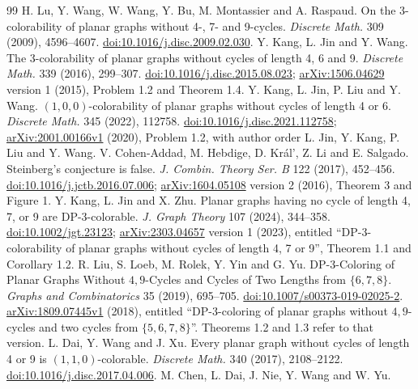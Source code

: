 \documentclass[11pt]{article}
\begin{document}
\begin{thebibliography}{99}
 H. Lu, Y. Wang, W. Wang, Y. Bu, M. Montassier and A. Raspaud.
On the 3-colorability of planar graphs without 4-, 7- and 9-cycles.
\emph{Discrete Math.} 309 (2009), 4596--4607.
\href{https://doi.org/10.1016/j.disc.2009.02.030}{doi:10.1016/j.disc.2009.02.030}.
 Y. Kang, L. Jin and Y. Wang.
The 3-colorability of planar graphs without cycles of length 4, 6 and 9.
\emph{Discrete Math.} 339 (2016), 299--307.
\href{https://doi.org/10.1016/j.disc.2015.08.023}{doi:10.1016/j.disc.2015.08.023};
\href{https://arxiv.org/abs/1506.04629v1}{arXiv:1506.04629} version 1 (2015), Problem 1.2 and Theorem 1.4.
 Y. Kang, L. Jin, P. Liu and Y. Wang.
$(1,0,0)$-colorability of planar graphs without cycles of length 4 or 6.
\emph{Discrete Math.} 345 (2022), 112758.
\href{https://doi.org/10.1016/j.disc.2021.112758}{doi:10.1016/j.disc.2021.112758};
\href{https://arxiv.org/abs/2001.00166v1}{arXiv:2001.00166v1} (2020), Problem 1.2, with author order L. Jin, Y. Kang, P. Liu and Y. Wang.
 V. Cohen-Addad, M. Hebdige, D. Král', Z. Li and E. Salgado.
Steinberg's conjecture is false.
\emph{J. Combin. Theory Ser. B} 122 (2017), 452--456.
\href{https://doi.org/10.1016/j.jctb.2016.07.006}{doi:10.1016/j.jctb.2016.07.006};
\href{https://arxiv.org/abs/1604.05108v2}{arXiv:1604.05108} version 2 (2016), Theorem 3 and Figure 1.
 Y. Kang, L. Jin and X. Zhu.
Planar graphs having no cycle of length 4, 7, or 9 are DP-3-colorable.
\emph{J. Graph Theory} 107 (2024), 344--358.
\href{https://doi.org/10.1002/jgt.23123}{doi:10.1002/jgt.23123};
\href{https://arxiv.org/abs/2303.04657v1}{arXiv:2303.04657} version 1 (2023),
entitled ``DP-3-colorability of planar graphs without cycles of length 4, 7 or 9'',
Theorem 1.1 and Corollary 1.2.
 R. Liu, S. Loeb, M. Rolek, Y. Yin and G. Yu.
DP-3-Coloring of Planar Graphs Without $4,9$-Cycles and Cycles of Two Lengths
from $\{6,7,8\}$. \emph{Graphs and Combinatorics} 35 (2019), 695--705.
\href{https://doi.org/10.1007/s00373-019-02025-2}{doi:10.1007/s00373-019-02025-2}.
\href{https://arxiv.org/abs/1809.07445v1}{arXiv:1809.07445v1} (2018),
entitled ``DP-3-coloring of planar graphs without $4,9$-cycles and two cycles
from $\{5,6,7,8\}$''. Theorems 1.2 and 1.3 refer to that version.
 L. Dai, Y. Wang and J. Xu.
Every planar graph without cycles of length 4 or 9 is $(1,1,0)$-colorable.
\emph{Discrete Math.} 340 (2017), 2108--2122.
\href{https://doi.org/10.1016/j.disc.2017.04.006}{doi:10.1016/j.disc.2017.04.006}.
 M. Chen, L. Dai, J. Nie, Y. Wang and W. Yu.

\end{thebibliography}
\end{document}
